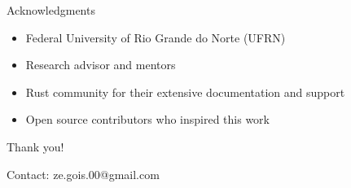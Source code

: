 \documentclass{beamer}
\begin{document}
\begin{frame}{Acknowledgments}
  \begin{itemize}
    \item Federal University of Rio Grande do Norte (UFRN)
    \item Research advisor and mentors
    \item Rust community for their extensive documentation and support
    \item Open source contributors who inspired this work
  \end{itemize}

  \vspace{1cm}
  \centering
  \large{Thank you!}

  \vspace{0.5cm}
  \small{Contact: ze.gois.00@gmail.com}
\end{frame}
\end{document}
